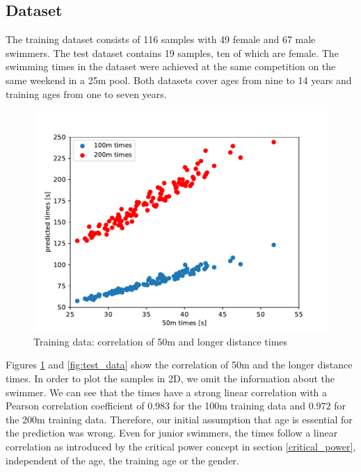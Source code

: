 \subsection{Dataset}
The training dataset consists of 116 samples with 49 female and 67 male swimmers. The test dataset contains 19 samples, ten of which are female. The swimming times in the dataset were achieved at the same competition on the same weekend in a 25m pool. Both datasets cover ages from nine to 14 years and training ages from one to seven years.
\begin{figure}[ht]
    \centering
    \includegraphics[scale=0.5]{visualisation/training_data.pdf}
    \caption{Training data: correlation of 50m and longer distance times}
    \label{fig:training_data}
\end{figure}
Figures \ref{fig:training_data} and \ref{fig:test_data} show the correlation of 50m and the longer distance times. In order to plot the samples in 2D, we omit the information about the swimmer. We can see that the times have a strong linear correlation with a Pearson correlation coefficient of $0.983$ for the 100m training data and $0.972$ for the 200m training data. Therefore, our initial assumption that age is essential for the prediction was wrong. Even for junior swimmers, the times follow a linear correlation as introduced by the critical power concept in section \ref{critical_power}, independent of the age, the training age or the gender.\\
